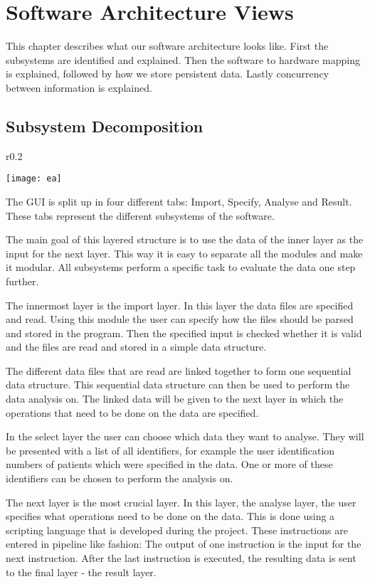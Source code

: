 \documentclass[a4paper,english,fleqn]{exam}
\begin{document}
\section{Software Architecture Views}
This chapter describes what our software architecture looks like. First the subsystems are identified and explained. Then the software to hardware mapping is explained, followed by how we store persistent data. Lastly concurrency between information is explained.

\subsection{Subsystem Decomposition}

\begin{wrapfigure}{r}{0.2\textwidth}
  \begin{center}
    \texttt{[image: ea]}
  \end{center}
\end{wrapfigure}

The GUI is split up in four different tabs: Import, Specify, Analyse and Result. These tabs represent the different subsystems of the software.

The main goal of this layered structure is to use the data of the inner layer as the input for the next layer. This way it is easy to separate all the modules and make it modular. All subsystems perform a specific task to evaluate the data one step further.

The innermost layer is the import layer. In this layer the data files are specified and read. Using this module the user can specify how the files should be parsed and stored in the program. Then the specified input is checked whether it is valid and the files are read and stored in a simple data structure. 

The different data files that are read are linked together to form one sequential data structure. This sequential data structure can then be used to perform the data analysis on. The linked data will be given to the next layer in which the operations that need to be done on the data are specified.

In the select layer the user can choose which data they want to analyse. They will be presented with a list of all identifiers, for example the user identification numbers of patients which were specified in the data. One or more of these identifiers can be chosen to perform the analysis on.

The next layer is the most crucial layer. In this layer, the analyse layer, the user specifies what operations need to be done on the data. This is done using a scripting language that is developed during the project. These instructions are entered in pipeline like fashion: The output of one instruction is the input for the next instruction. After the last instruction is executed, the resulting data is sent to the final layer - the result layer.
\end{document}
